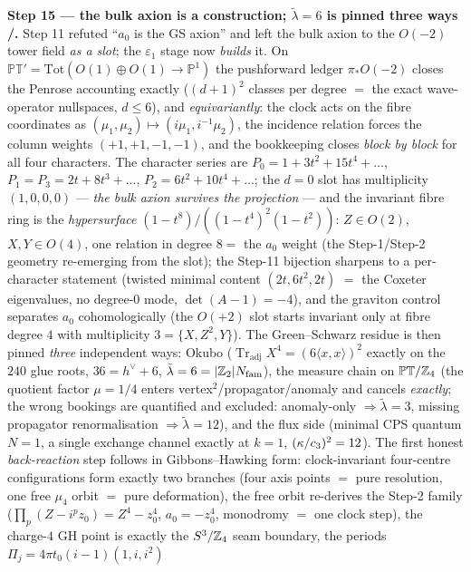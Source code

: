\par\smallskip\noindent\textbf{Step 15 --- the bulk axion is a construction; $\tilde\lambda=6$ is
pinned three ways \mE/\mC.} Step 11 refuted ``$a_0$ is the GS axion'' and left the bulk axion to
the $O(-2)$ tower field \emph{as a slot}; the $\varepsilon_1$ stage now \emph{builds} it. On
$\mathbb{PT}'=\mathrm{Tot}(O(1){\oplus}O(1)\to\mathbb P^1)$ the pushforward ledger $\pi_*O(-2)$
closes the Penrose accounting exactly ($(d{+}1)^2$ classes per degree $=$ the exact wave-operator
nullspaces, $d\le6$), and \emph{equivariantly}: the clock acts on the fibre coordinates as
$(\mu_1,\mu_2)\mapsto(i\mu_1,i^{-1}\mu_2)$, the incidence relation forces the column weights
$(+1,+1,-1,-1)$, and the bookkeeping closes \emph{block by block} for all four characters. The
character series are $P_0=1+3t^2+15t^4+\dots$, $P_1=P_3=2t+8t^3+\dots$, $P_2=6t^2+10t^4+\dots$;
the $d=0$ slot has multiplicity $(1,0,0,0)$ --- \emph{the bulk axion survives the projection} ---
and the invariant fibre ring is the \emph{hypersurface} $(1-t^8)/((1-t^4)^2(1-t^2))$: $Z\in O(2)$,
$X,Y\in O(4)$, one relation in degree $8=$ the $a_0$ weight (the Step-1/Step-2 geometry
re-emerging from the slot); the Step-11 bijection sharpens to a per-character statement (twisted
minimal content $(2t,6t^2,2t)$ $=$ the Coxeter eigenvalues, no degree-$0$ mode,
$\det(A-1)=-4$), and the graviton control separates $a_0$ cohomologically (the $O(+2)$ slot
starts invariant only at fibre degree $4$ with multiplicity $3=\{X,Z^2,Y\}$). The Green--Schwarz
residue is then pinned \emph{three} independent ways: Okubo
($\operatorname{Tr}_{\mathrm{adj}}X^4=(6\langle x,x\rangle)^2$ exactly on the $240$ glue roots,
$36=h^\vee+6$, $\tilde\lambda=6=|\mathbb{Z}_2|N_{\mathrm{fam}}$), the measure chain on $\mathbb{PT}/\mathbb{Z}_4$
(the quotient factor $\mu=1/4$ enters vertex$^2$/propagator/anomaly and cancels \emph{exactly};
the wrong bookings are quantified and excluded: anomaly-only $\Rightarrow\tilde\lambda=3$,
missing propagator renormalisation $\Rightarrow\tilde\lambda=12$), and the flux side (minimal
CPS quantum $N=1$, a single exchange channel exactly at $k=1$, $(\kappa/c_3)^2=12$). The
first honest \emph{back-reaction} step follows in Gibbons--Hawking form: clock-invariant
four-centre configurations form exactly two branches (four axis points $=$ pure resolution, one
free $\mu_4$ orbit $=$ pure deformation), the free orbit re-derives the Step-2 family
($\prod_p(Z-i^pz_0)=Z^4-z_0^4$, $a_0=-z_0^4$, monodromy $=$ one clock step), the charge-$4$ GH
point is exactly the $S^3/\mathbb{Z}_4$ seam boundary, the periods $\Pi_j=4\pi t_0(i-1)(1,i,i^2)$
